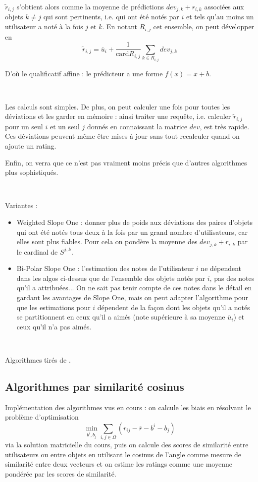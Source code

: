 \documentclass[11pt, openany, a4paper]{article}
\newcommand{\card}{\mathrm{card}}
\begin{document}
		 $\tilde r_{i,j}$ s'obtient alors comme la moyenne de prédictions $dev_{j,k}+r_{i,k}$ associées aux objets $k\neq j$ qui sont pertinents, i.e. qui ont été notés par $i$ et tels qu'au moins un utilisateur a noté à la fois $j$ et $k$. En notant $R_{i,j}$ cet ensemble, on peut développer en
		 $$\tilde r_{i,j} = \overline u_i + \frac{1}{\card R_{i,j}} \sum\limits_{k\in R_{i,j}} dev_{j,k}$$
		 
		 D'où le qualificatif affine : le prédicteur a une forme $f(x)=x+b$.
	
		\
		
		Les calculs sont simples. De plus, on peut calculer une fois pour toutes les déviations et les garder en mémoire : ainsi traiter une requête, i.e. calculer $\tilde r_{i,j}$ pour un seul $i$ et un seul $j$ donnés en connaissant la matrice $dev$, est très rapide.  Ces déviations peuvent même être mises à jour sans tout recalculer quand on ajoute un rating.
		
		Enfin, on verra que ce n'est pas vraiment moins précis que d'autres algorithmes plus sophistiqués.
		
		\
		
		Variantes : 
		\begin{itemize}
		\item 
		Weighted Slope One : donner plus de poids aux déviations des paires d'objets qui ont été notés tous deux à la fois par un grand nombre d'utilisateurs, car elles sont plus fiables. Pour cela on pondère la moyenne des $dev_{j,k}+r_{i,k}$ par le cardinal de $S^{j,k}$.
		
		\item
		Bi-Polar Slope One : l'estimation des notes de l'utilisateur $i$ ne dépendent dans les algos ci-dessus que de l'ensemble des objets notés par $i$, pas des notes qu'il a attribuées... On ne sait pas tenir compte de ces notes dans le détail en gardant les avantages de Slope One, mais on peut adapter l'algorithme pour que les estimations pour $i$ dépendent de la façon dont les objets qu'il a notés se partitionnent en ceux qu'il a aimés (note supérieure à sa moyenne $\overline u_i$) et ceux qu'il n'a pas aimés.
		\end{itemize}
		
		\
		
		Algorithmes tirés de \cite{Lemire2007}.
	\subsection{Algorithmes par similarité cosinus}
		\label{simCos}
		Implémentation des algorithmes vus en cours : on calcule les biais en résolvant le problème d'optimisation $$\min_{b^i, b_j}\sum_{i,j\in\Omega}(r_{ij} - \overline{r} - b^i - b_j)$$ via la solution matricielle du cours, puis on calcule des scores de similarité entre utilisateurs ou entre objets en utilisant le cosinus de l'angle comme mesure de similarité entre deux vecteurs et on estime les ratings comme une moyenne pondérée par les scores de similarité.
		
\end{document}
